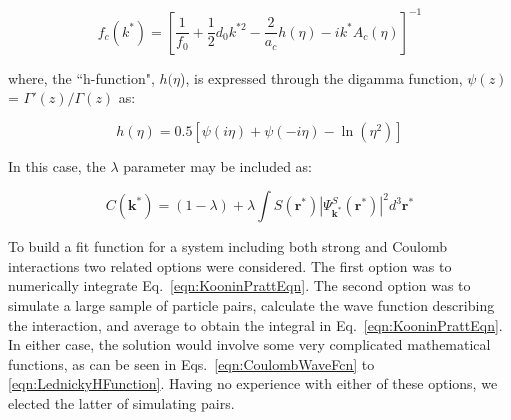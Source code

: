 \documentclass[ALICE,manyauthors]{cernphprep}
\begin{document}
\begin{equation}
 f_{c}(k^{*}) = [\frac{1}{f_{0}} + \frac{1}{2}d_{0}k^{*2} - \frac{2}{a_{c}}h(\eta) - ik^{*}A_{c}(\eta)]^{-1}
\label{eqn:CoulombScattAmp}
\end{equation}

where, the ``h-function", $h(\eta$), is expressed through the digamma function, $\psi(z)$ = $\Gamma'(z)/\Gamma(z)$ as:

\begin{equation}
 h(\eta) = 0.5[\psi(i\eta) + \psi(-i\eta) - \ln(\eta^{2})]
\label{eqn:LednickyHFunction}
\end{equation} 

In this case, the $\lambda$ parameter may be included as: 

\begin{equation}
 C(\mathbf{k^{*}}) = (1 - \lambda) + \lambda\int S(\mathbf{r^{*}})|\Psi^{S}_{\mathbf{k^{*}}}(\mathbf{r^{*}})|^{2}d^{3}\mathbf{r^{*}}
\label{eqn:GenCfEqnwLambda}
\end{equation}

To build a fit function for a system including both strong and Coulomb interactions two related options were considered. 
The first option was to numerically integrate Eq.\ \ref{eqn:KooninPrattEqn}.  
The second option was to simulate a large sample of particle pairs, calculate the wave function describing the interaction, and average to obtain the integral in Eq.\ \ref{eqn:KooninPrattEqn}. 
In either case, the solution would involve some very complicated mathematical functions, as can be seen in Eqs.\ \ref{eqn:CoulombWaveFcn} to \ref{eqn:LednickyHFunction}.
Having no experience with either of these options, we elected the latter of simulating pairs. 

\end{document}
